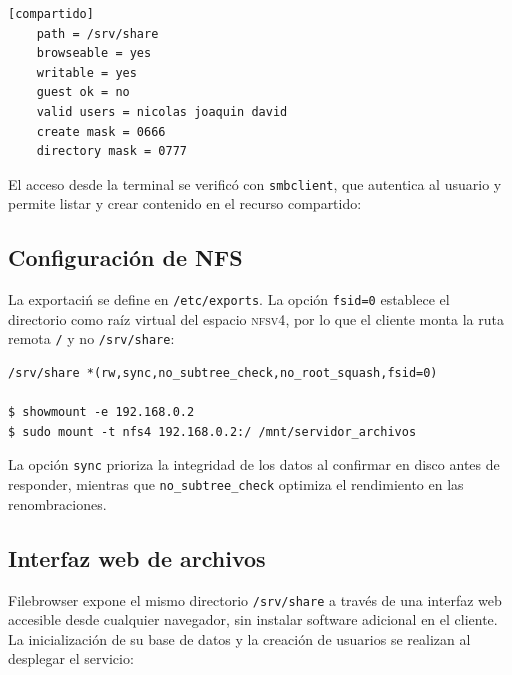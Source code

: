 \begin{lstlisting}[style=terminal]
[compartido]
    path = /srv/share
    browseable = yes
    writable = yes
    guest ok = no
    valid users = nicolas joaquin david
    create mask = 0666
    directory mask = 0777
\end{lstlisting}

El acceso desde la terminal se verific\'o con \texttt{smbclient}, que
autentica al usuario y permite listar y crear contenido en el recurso
compartido:


\subsection{Configuraci\'on de NFS}

La exportaci\'n se define en \texttt{/etc/exports}. La opci\'on
\texttt{fsid=0} establece el directorio como ra\'iz virtual del espacio
\textsc{nfsv4}, por lo que el cliente monta la ruta remota \texttt{/} y no
\texttt{/srv/share}:

\begin{lstlisting}[style=terminal]
/srv/share *(rw,sync,no_subtree_check,no_root_squash,fsid=0)

$ showmount -e 192.168.0.2
$ sudo mount -t nfs4 192.168.0.2:/ /mnt/servidor_archivos
\end{lstlisting}

La opci\'on \texttt{sync} prioriza la integridad de los datos al confirmar
en disco antes de responder, mientras que \texttt{no\_subtree\_check}
optimiza el rendimiento en las renombraciones.


\subsection{Interfaz web de archivos}

Filebrowser expone el mismo directorio \texttt{/srv/share} a trav\'es de
una interfaz web accesible desde cualquier navegador, sin instalar software
adicional en el cliente. La inicializaci\'on de su base de datos y la
creaci\'on de usuarios se realizan al desplegar el servicio:

